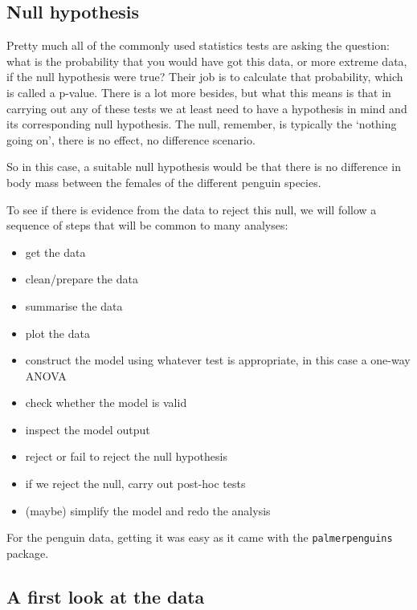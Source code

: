 \documentclass[
  letterpaper,
  DIV=11,
  numbers=noendperiod]{scrreprt}
\providecommand{\tightlist}{%
  \setlength{\itemsep}{0pt}\setlength{\parskip}{0pt}}\usepackage{longtable,booktabs,array}
\begin{document}
\subsection{Null hypothesis}\label{null-hypothesis}

Pretty much all of the commonly used statistics tests are asking the
question: what is the probability that you would have got this data, or
more extreme data, if the null hypothesis were true? Their job is to
calculate that probability, which is called a p-value. There is a lot
more besides, but what this means is that in carrying out any of these
tests we at least need to have a hypothesis in mind and its
corresponding null hypothesis. The null, remember, is typically the
`nothing going on', there is no effect, no difference scenario.

So in this case, a suitable null hypothesis would be that there is no
difference in body mass between the females of the different penguin
species.

To see if there is evidence from the data to reject this null, we will
follow a sequence of steps that will be common to many analyses:

\begin{itemize}
\tightlist
\item
  get the data
\item
  clean/prepare the data
\item
  summarise the data
\item
  plot the data
\item
  construct the model using whatever test is appropriate, in this case a
  one-way ANOVA
\item
  check whether the model is valid
\item
  inspect the model output
\item
  reject or fail to reject the null hypothesis
\item
  if we reject the null, carry out post-hoc tests
\item
  (maybe) simplify the model and redo the analysis
\end{itemize}

For the penguin data, getting it was easy as it came with the
\texttt{palmerpenguins} package.

\subsection{A first look at the data}\label{a-first-look-at-the-data}
\end{document}
